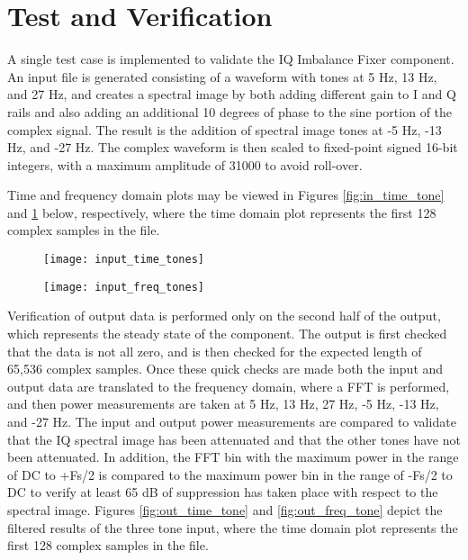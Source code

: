 \documentclass{article}
\begin{document}
\section*{Test and Verification}
\begin{flushleft}
A single test case is implemented to validate the IQ Imbalance Fixer component. An input file is generated consisting of a waveform with tones at 5 Hz, 13 Hz, and 27 Hz, and creates a spectral image by both adding different gain to I and Q rails and also adding an additional 10 degrees of phase to the sine portion of the complex signal. The result is the addition of spectral image tones at -5 Hz, -13 Hz, and -27 Hz. The complex waveform is then scaled to fixed-point signed 16-bit integers, with a maximum amplitude of 31000 to avoid roll-over.\medskip

Time and frequency domain plots may be viewed in Figures \ref{fig:in_time_tone} and \ref{fig:in_freq_tone} below, respectively, where the time domain plot represents the first 128 complex samples in the file.
\end{flushleft}

\begin{figure}[ht]
	\centering
	\begin{minipage}{.5\textwidth}
		\centering\texttt{[image: input\_time\_tones]}
		\label{fig:in_time_tone}
	\end{minipage}%
	\begin{minipage}{.5\textwidth}
		\centering\texttt{[image: input\_freq\_tones]}
		\label{fig:in_freq_tone}
	\end{minipage}
\end{figure}

\begin{flushleft}
Verification of output data is performed only on the second half of the output, which represents the steady state of the component. The output is first checked that the data is not all zero, and is then checked for the expected length of 65,536 complex samples. Once these quick checks are made both the input and output data are translated to the frequency domain, where a FFT is performed, and then power measurements are taken at 5 Hz, 13 Hz, 27 Hz, -5 Hz, -13 Hz, and -27 Hz. The input and output power measurements are compared to validate that the IQ spectral image has been attenuated and that the other tones have not been attenuated. In addition, the FFT bin with the maximum power in the range of DC to +Fs/2 is compared to the maximum power bin in the range of -Fs/2 to DC to verify at least 65 dB of suppression has taken place with respect to the spectral image. Figures \ref{fig:out_time_tone} and \ref{fig:out_freq_tone} depict the filtered results of the three tone input, where the time domain plot represents the first 128 complex samples in the file.
\end{flushleft}
\end{document}
